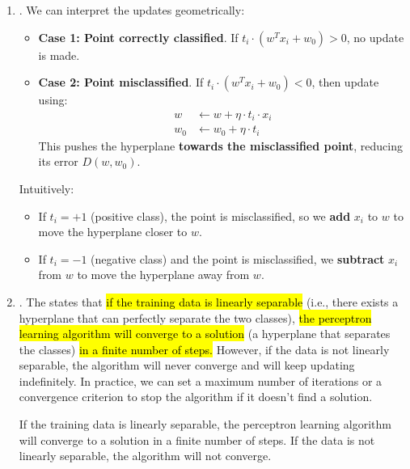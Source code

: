 \begin{enumerate}
    \item {}. We can interpret the updates geometrically:
    \begin{itemize}
        \item \textbf{Case 1: Point correctly classified}. If $t_i \cdot \left(w^{T} x_i + w_0\right) > 0$, no update is made.
        \item \textbf{Case 2: Point misclassified}. If $t_i \cdot \left(w^{T} x_i + w_0\right) < 0$, then update using:
        \begin{align*}
            w &\leftarrow w + \eta \cdot t_i \cdot x_i \\[.3em]
            w_0 &\leftarrow w_0 + \eta \cdot t_i
        \end{align*}
        This pushes the hyperplane \textbf{towards the misclassified point}, reducing its error $D\left(w, w_0\right)$.
    \end{itemize}
    Intuitively:
    \begin{itemize}
        \item If $t_i = +1$ (positive class), the point is misclassified, so we \textbf{add} $x_i$ to $w$ to move the hyperplane closer to $w$.
        \item If $t_i = -1$ (negative class) and the point is misclassified, we \textbf{subtract} $x_i$ from $w$ to move the hyperplane away from $w$.
    \end{itemize}

    \item {}. The  states that \hl{if the training data is linearly separable} (i.e., there exists a hyperplane that can perfectly separate the two classes), \hl{the perceptron learning algorithm will converge to a solution} (a hyperplane that separates the classes) \hl{in a finite number of steps.} However, if the data is not linearly separable, the algorithm will never converge and will keep updating indefinitely. In practice, we can set a maximum number of iterations or a convergence criterion to stop the algorithm if it doesn't find a solution.
    
    \begin{theorem}
        If the training data is linearly separable, the perceptron learning algorithm will converge to a solution in a finite number of steps. If the data is not linearly separable, the algorithm will not converge.
    \end{theorem}
\end{enumerate}

